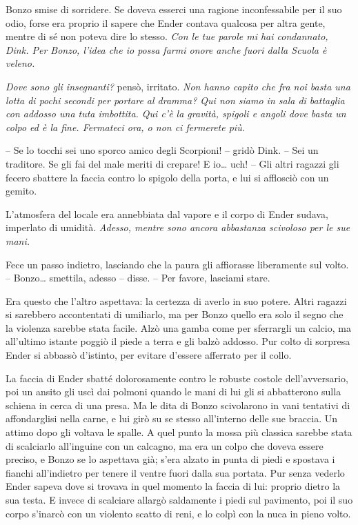{Bonzo smise di sorridere. Se doveva esserci una ragione inconfessabile
	per il suo odio, forse era proprio il sapere che Ender contava qualcosa
	per altra gente, mentre di sé non poteva dire lo stesso. \emph{Con le
		tue parole mi hai condannato, Dink. Per Bonzo, l'idea che io possa farmi
		onore anche fuori dalla Scuola è veleno.}}

\emph{{Dove sono gli insegnanti? }}{pensò, irritato. \emph{Non hanno
		capito che fra noi basta una lotta di pochi secondi per portare al
		dramma? Qui non siamo in sala di battaglia con addosso una tuta
		imbottita. Qui c'è la gravità, spigoli e angoli dove basta un colpo ed è
		la fine. Fermateci ora, o non ci fermerete più.}}

{-- Se lo tocchi sei uno sporco amico degli Scorpioni! -- gridò Dink. --
	Sei un traditore. Se gli fai del male meriti di crepare! E io\ldots{}
	uch! -- Gli altri ragazzi gli fecero sbattere la faccia contro lo
	spigolo della porta, e lui si afflosciò con un gemito.}

{L'atmosfera del locale era annebbiata dal vapore e il corpo di Ender
	sudava, imperlato di umidità. \emph{Adesso, mentre sono ancora
		abbastanza scivoloso per le sue mani.}}

{Fece un passo indietro, lasciando che la paura gli affiorasse
	liberamente sul volto. -- Bonzo\ldots{} smettila, adesso -- disse. --
	Per favore, lasciami stare.}

{Era questo che l'altro aspettava: la certezza di averlo in suo potere.
	Altri ragazzi si sarebbero accontentati di umiliarlo, ma per Bonzo
	quello era solo il segno che la violenza sarebbe stata facile. Alzò una
	gamba come per sferrargli un calcio, ma all'ultimo istante poggiò il
	piede a terra e gli balzò addosso. Pur colto di sorpresa Ender si
	abbassò d'istinto, per evitare d'essere afferrato per il collo.}

{La faccia di Ender sbatté dolorosamente contro le robuste costole
	dell'avversario, poi un ansito gli uscì dai polmoni quando le mani di
	lui gli si abbatterono sulla schiena in cerca di una presa. Ma le dita
	di Bonzo scivolarono in vani tentativi di affondarglisi nella carne, e
	lui girò su se stesso all'interno delle sue braccia. Un attimo dopo gli
	voltava le spalle. A quel punto la mossa più classica sarebbe stata di
	scalciarlo all'inguine con un calcagno, ma era un colpo che doveva
	essere preciso, e Bonzo se lo aspettava già; s'era alzato in punta di
	piedi e spostava i fianchi all'indietro per tenere il ventre fuori dalla
	sua portata. Pur senza vederlo Ender sapeva dove si trovava in quel
	momento la faccia di lui: proprio dietro la sua testa. E invece di
	scalciare allargò saldamente i piedi sul pavimento, poi il suo corpo
	s'inarcò con un violento scatto di reni, e lo colpì con la nuca in pieno
	volto.}

